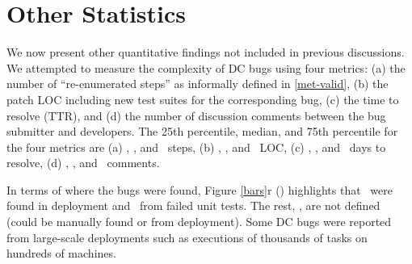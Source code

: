 



\section{Other Statistics}
\label{sec-stat}

% 

\fi

We now present other quantitative findings not included in
previous discussions.  We attempted to measure the complexity of DC
bugs using four metrics: (a) the number of ``re-enumerated steps'' as
informally defined in \sec\ref{met-valid}, (b) the patch LOC
including new test suites for the corresponding bug, (c) the time to
resolve (TTR), and (d) the number of discussion comments between the
bug submitter and developers.
%
The 25th percentile, median, and 75th percentile for the four metrics
are
%
(a) \stepTFP, \stepMed, and \stepSFP\ steps, 
%
(b) \locTFP, \locMed, and \locSFP\ LOC, 
%
(c) \ttrTFP, \ttrMed, and \ttrSFP\ days to resolve, 
%
(d) \commTFP, \commMed, and \commSFP\ comments.  

In terms of where the bugs were found, Figure \ref{bars}r (\BWHR)
highlights that \pctWhrField\ were found in deployment and
\pctWhrTest\ from failed unit tests.  The rest, \pctWhrNotDef, are not
defined (could be manually found or from deployment).  Some DC bugs
were reported from large-scale deployments such as executions of
thousands of tasks on hundreds of machines.%


